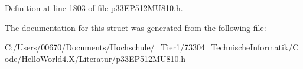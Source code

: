 Definition at line 1803 of file p33\+E\+P512\+M\+U810.\+h.



The documentation for this struct was generated from the following file\+:\begin{DoxyCompactItemize}
\item 
C\+:/\+Users/00670/\+Documents/\+Hochschule/\+\_\+\+Tier1/73304\+\_\+\+Technische\+Informatik/\+Code/\+Hello\+World4.\+X/\+Literatur/\hyperlink{p33_e_p512_m_u810_8h}{p33\+E\+P512\+M\+U810.\+h}\end{DoxyCompactItemize}
